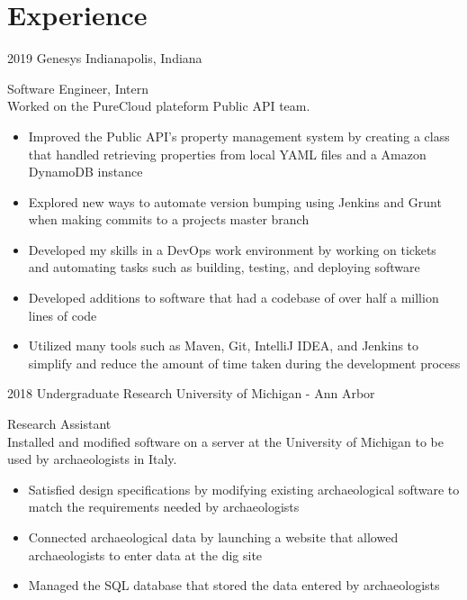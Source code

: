 \documentclass[]{cv-style}
\begin{document}
\section{Experience}
\begin{entrylist}
\entry
{2019}
{Genesys}
{Indianapolis, Indiana}
{Software Engineer, Intern\\
Worked on the PureCloud plateform Public API team.
\begin{itemize}
    \item Improved the Public API's property management system by creating a class that handled retrieving properties from local YAML files and a Amazon DynamoDB instance
    \item Explored new ways to automate version bumping using Jenkins and Grunt when making commits to a projects master branch
    \item Developed my skills in a DevOps work environment by working on tickets and automating tasks such as building, testing, and deploying software
    \item Developed additions to software that had a codebase of over half a million lines of code
    \item Utilized many tools such as Maven, Git, IntelliJ IDEA, and Jenkins to simplify and reduce the amount of time taken during the development process
\end{itemize}}
\entry
{2018}
{Undergraduate Research}
{University of Michigan - Ann Arbor}
{Research Assistant\\
Installed and modified software on a server at the University of Michigan to be used by archaeologists in Italy. 
\begin{itemize}
    \item Satisfied design specifications by modifying existing archaeological software to match the requirements needed by archaeologists
    \item Connected archaeological data by launching a website that allowed archaeologists to enter data at the dig site
    \item Managed the SQL database that stored the data entered by archaeologists
\end{itemize}}
\end{entrylist}
\end{document}
